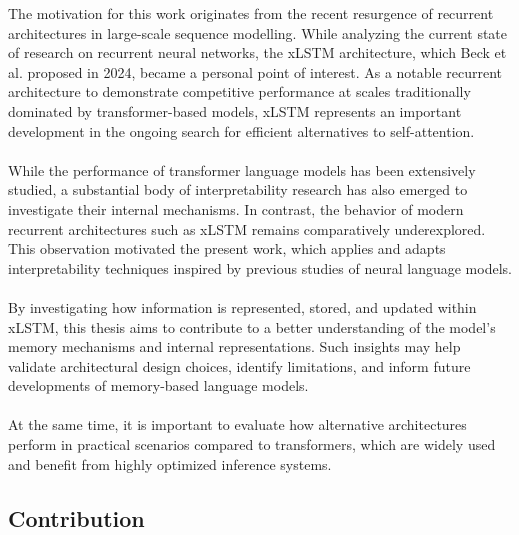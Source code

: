 The motivation for this work originates from the recent resurgence of recurrent architectures in large-scale sequence 
modelling. While analyzing the current state of research on recurrent neural networks, the xLSTM architecture, which 
Beck et al.\cite{beck2024xlstmextendedlongshortterm} proposed in 2024, became a personal point of interest. 
As a notable recurrent architecture to demonstrate competitive performance at scales traditionally dominated by 
transformer-based models, xLSTM represents an important development in the ongoing search for efficient alternatives 
to self-attention. \\ \\ 
%
While the performance of transformer language models has been extensively studied, a substantial body of 
interpretability research has also emerged to investigate their internal mechanisms. In contrast, the behavior 
of modern recurrent architectures such as xLSTM remains comparatively underexplored. This observation motivated 
the present work, which applies and adapts interpretability techniques inspired by previous studies of 
neural language models. \\ \\
%
By investigating how information is represented, stored, and updated within xLSTM, this thesis aims to contribute 
to a better understanding of the model's memory mechanisms and internal representations. Such insights may help 
validate architectural design choices, identify limitations, and inform future developments of memory-based language models.\\ \\
%
At the same time, it is important to evaluate how alternative architectures perform in practical scenarios compared to transformers, 
which are widely used and benefit from highly optimized inference systems.
\subsection{Contribution}

